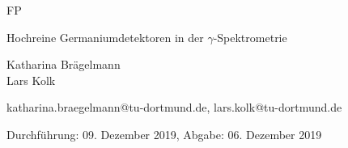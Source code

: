 \newcommand{\Titel}{Hochreine Germaniumdetektoren in der $\gamma$-Spektrometrie}
\newcommand{\DatumDu}{09. Dezember 2019}
\newcommand{\DatumAb}{06. Dezember 2019}
\newcommand{\Autoreins}{Katharina Brägelmann}
\newcommand{\Emaileins}{katharina.braegelmann@tu-dortmund.de}
\newcommand{\Autorzwei}{Lars Kolk}
\newcommand{\Emailzwei}{lars.kolk@tu-dortmund.de}



\begin{titlepage}

\begin{center} \large

  FP
  \vspace*{2.5cm}

  {\huge \Titel}
  \vspace*{3cm}

  \Autoreins
  \\\Autorzwei
  \vspace*{1.5cm}

  \Emaileins, \Emailzwei


  Durchführung: \DatumDu, Abgabe: \DatumAb
  \vspace*{4.5cm}


\end{center}
\end{titlepage}
